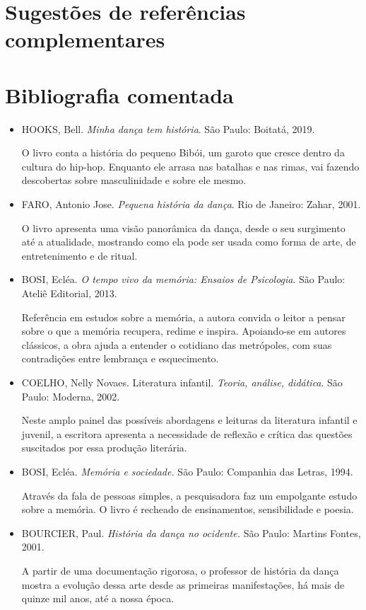 \documentclass[12pt]{extarticle}
\begin{document}
\section{Sugestões de referências complementares}\label{sugestoes}




\section{Bibliografia comentada}

\begin{itemize}


\item \textsc{HOOKS}, Bell. \emph{Minha dança tem história}. São Paulo:
  Boitatá, 2019.

O livro conta a história do pequeno Bibói, um garoto que cresce dentro
  da cultura do hip-hop. Enquanto ele arrasa nas batalhas e nas rimas, vai
  fazendo descobertas sobre masculinidade e sobre ele mesmo.

\item \textsc{FARO}, Antonio Jose. \emph{Pequena história da dança}. Rio de Janeiro: Zahar,
  2001.

O livro apresenta uma visão panorâmica da dança, desde o seu surgimento
  até a atualidade, mostrando como ela pode ser usada como forma de arte, de
  entretenimento e de ritual.

\item \textsc{BOSI}, Ecléa. \emph{O tempo vivo da memória: Ensaios de Psicologia}. São Paulo:
  Ateliê Editorial, 2013.

Referência em estudos sobre a memória, a autora convida o leitor a
  pensar sobre o que a memória recupera, redime e inspira. Apoiando-se em
  autores clássicos, a obra ajuda a entender o cotidiano das metrópoles, com
  suas contradições entre lembrança e esquecimento. 

\item  
\textsc{COELHO}, Nelly Novaes. Literatura infantil. \emph{Teoria,
análise, didática}. São Paulo: Moderna, 2002.

Neste amplo painel das possíveis abordagens e leituras da literatura
infantil e juvenil, a escritora apresenta a necessidade de reflexão e crítica
das questões suscitados por essa produção literária.

\item
\textsc{BOSI}, Ecléa. \emph{Memória e sociedade.} São Paulo: Companhia
das Letras, 1994.

Através da fala de pessoas simples, a pesquisadora faz um empolgante
estudo sobre a memória. O livro é recheado de ensinamentos, sensibilidade e
poesia.

\item
\textsc{BOURCIER}, Paul. \emph{História da dança no ocidente.} São Paulo:
Martins Fontes, 2001. 

A partir de uma documentação rigorosa, o professor de história da dança
mostra a evolução dessa arte desde as primeiras manifestações, há mais de
quinze mil anos, até a nossa época.

\end{itemize}
\end{document}

